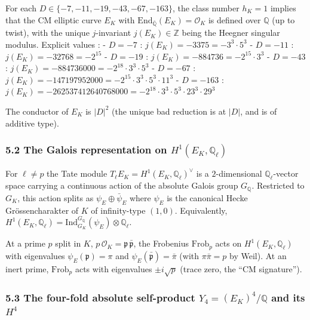 \documentclass[
  11pt,
  a4paper,
]{amsart}
\begin{document}
For each \(D \in \{-7, -11, -19, -43, -67, -163\}\), the class number \(h_K = 1\) implies that the CM elliptic curve \(E_K\) with \(\mathrm{End}_{\bar{\mathbb{Q}}}(E_K) = \mathcal{O}_K\) is defined over \(\mathbb{Q}\) (up to twist), with the unique \(j\)-invariant \(j(E_K) \in \mathbb{Z}\) being the Heegner singular modulus. Explicit values :
- \(D = -7\) : \(j(E_K) = -3375 = -3^3 \cdot 5^3\)
- \(D = -11\) : \(j(E_K) = -32768 = -2^{15}\)
- \(D = -19\) : \(j(E_K) = -884736 = -2^{15} \cdot 3^3\)
- \(D = -43\) : \(j(E_K) = -884736000 = -2^{18} \cdot 3^3 \cdot 5^3\)
- \(D = -67\) : \(j(E_K) = -147197952000 = -2^{15} \cdot 3^3 \cdot 5^3 \cdot 11^3\)
- \(D = -163\) : \(j(E_K) = -262537412640768000 = -2^{18} \cdot 3^3 \cdot 5^3 \cdot 23^3 \cdot 29^3\)

The conductor of \(E_K\) is \(|D|^2\) (the unique bad reduction is at \(|D|\), and is of additive type).

\hypertarget{the-galois-representation-on-h1e_k-mathbbq_ell}{%
\subsubsection{\texorpdfstring{5.2 The Galois representation on \(H^1(E_K, \mathbb{Q}_\ell)\)}{5.2 The Galois representation on H\^{}1(E\_K, \textbackslash mathbb\{Q\}\_\textbackslash ell)}}\label{the-galois-representation-on-h1e_k-mathbbq_ell}}

For \(\ell \neq p\) the Tate module \(T_\ell E_K = H^1(E_K, \mathbb{Q}_\ell)^\vee\) is a \(2\)-dimensional \(\mathbb{Q}_\ell\)-vector space carrying a continuous action of the absolute Galois group \(G_\mathbb{Q}\). Restricted to \(G_K\), this action splits as \(\psi_E \oplus \bar\psi_E\) where \(\psi_E\) is the canonical Hecke Grössencharakter of \(K\) of infinity-type \((1, 0)\). Equivalently, \(H^1(E_K, \mathbb{Q}_\ell) = \mathrm{Ind}_{G_K}^{G_\mathbb{Q}}(\psi_E) \otimes \mathbb{Q}_\ell\).

At a prime \(p\) split in \(K\), \(p\,\mathcal{O}_K = \mathfrak{p}\,\bar{\mathfrak{p}}\), the Frobenius \(\mathrm{Frob}_p\) acts on \(H^1(E_K, \mathbb{Q}_\ell)\) with eigenvalues \(\psi_E(\mathfrak{p}) = \pi\) and \(\psi_E(\bar{\mathfrak{p}}) = \bar\pi\) (with \(\pi\bar\pi = p\) by Weil). At an inert prime, \(\mathrm{Frob}_p\) acts with eigenvalues \(\pm i\sqrt p\) (trace zero, the ``CM signature'').

\hypertarget{the-four-fold-absolute-self-product-y_4-e_k4-mathbbq-and-its-h4}{%
\subsubsection{\texorpdfstring{5.3 The four-fold absolute self-product \(Y_4 = (E_K)^4 / \mathbb{Q}\) and its \(H^4\)}{5.3 The four-fold absolute self-product Y\_4 = (E\_K)\^{}4 / \textbackslash mathbb\{Q\} and its H\^{}4}}\label{the-four-fold-absolute-self-product-y_4-e_k4-mathbbq-and-its-h4}}
\end{document}
